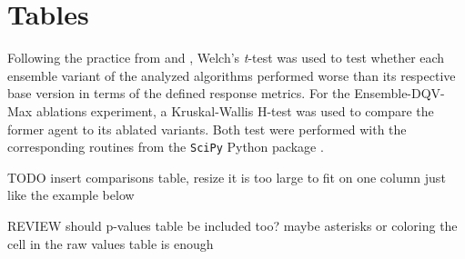 \section{Tables}\label{sec:appendix_tables}
Following the practice from \citet{DBLP:journals/corr/abs-1709-06560}
and \citet{https://doi.org/10.48550/arxiv.1904.06979}, Welch's
\textit{t}-test was used to test whether each ensemble variant of the
analyzed algorithms performed worse than its respective base version
in terms of the defined response metrics.
For the Ensemble-DQV-Max ablations experiment, a Kruskal-Wallis H-test
was used to compare the former agent to its ablated variants.
Both test were performed with the corresponding routines from the
\texttt{SciPy} Python package \citep{2020SciPy-NMeth}.

TODO insert comparisons table, resize it is too large to fit on one
column just like the example below

REVIEW should p-values table be included too? maybe asterisks or
coloring the cell in the raw values table is enough

